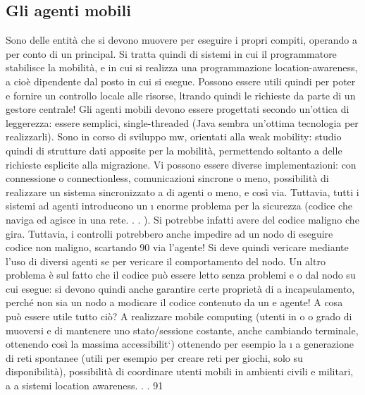 \documentclass[a4paper,12pt]{article}
\begin{document}
\subsection{Gli agenti mobili}
Sono delle entità che si devono muovere per eseguire i propri compiti, operando
a
per conto di un principal. Si tratta quindi di sistemi in cui il programmatore stabilisce la mobilità, e in cui si
realizza una programmazione location-awareness,
a
cioè dipendente dal posto in cui si esegue. Possono essere utili quindi per poter
e
fornire un controllo locale alle risorse, ltrando quindi le richieste da parte di un
gestore centrale! Gli agenti mobili devono essere progettati secondo un'ottica di
leggerezza: essere semplici, single-threaded (Java sembra un'ottima tecnologia
per realizzarli). Sono in corso di sviluppo mw, orientati alla weak mobility:
studio quindi di strutture dati apposite per la mobilità, permettendo soltanto
a
delle richieste esplicite alla migrazione.
Vi possono essere diverse implementazioni: con connessione o connectionless,
comunicazioni sincrone o meno, possibilità di realizzare un sistema sincronizzato
a
di agenti o meno, e così via. Tuttavia, tutti i sistemi ad agenti introducono un
\i{}
enorme problema per la sicurezza (codice che naviga ed agisce in una rete. . . ). Si
potrebbe infatti avere del codice maligno che gira. Tuttavia, i controlli potrebbero anche impedire ad un nodo di
eseguire codice non maligno, scartando
90
via l'agente! Si deve quindi vericare mediante l'uso di diversi agenti se per
vericare il comportamento del nodo.
Un altro problema è sul fatto che il codice può essere letto senza problemi
e
o
dal nodo su cui esegue: si devono quindi anche garantire certe proprietà di
a
incapsulamento, perché non sia un nodo a modicare il codice contenuto da un
e
agente!
A cosa può essere utile tutto ciò? A realizzare mobile computing (utenti in
o
o
grado di muoversi e di mantenere uno stato/sessione costante, anche cambiando
terminale, ottenendo così la massima accessibilit`) ottenendo per esempio la
\i{}
a
generazione di reti spontanee (utili per esempio per creare reti per giochi, solo su
disponibilità), possibilità di coordinare utenti mobili in ambienti civili e militari,
a
a
sistemi location awareness. . .
91
\end{document}

